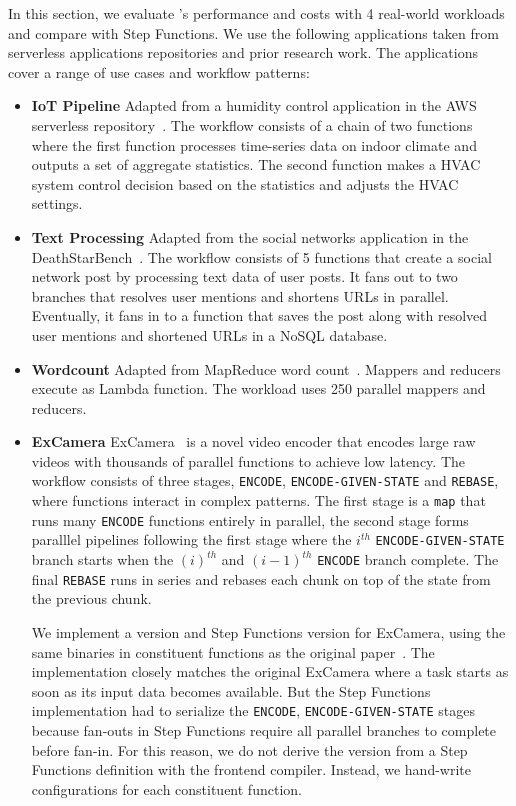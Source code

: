In this section, we evaluate \name{}'s performance and costs with 4 real-world
workloads and compare with Step Functions. We use the following applications
taken from serverless applications repositories and prior research work. The
applications cover a range of use cases and workflow patterns:

\begin{itemize}
    \item \textbf{IoT Pipeline} Adapted from a humidity control application in the
    AWS serverless repository~\cite{iot-pipeline}. The workflow consists of a
    chain of two functions where the first function processes time-series data on
    indoor climate and outputs a set of aggregate statistics. The second function
    makes a HVAC system control decision based on the statistics and adjusts the
    HVAC settings.

    \item \textbf{Text Processing} Adapted from the social networks application in
    the DeathStarBench~\cite{deathstar}. The workflow consists of 5 functions that
    create a social network post by processing text data of user posts. It fans
    out to two branches that resolves user mentions and shortens URLs in parallel.
    Eventually, it fans in to a function that saves the post along with resolved
    user mentions and shortened URLs in a NoSQL database.

    \item \textbf{Wordcount} Adapted from MapReduce word count~\cite{mapreduce}.
    Mappers and reducers execute as Lambda function. The workload uses 250
    parallel mappers and reducers.

    \item \textbf{ExCamera} ExCamera~\cite{excamera} is a novel video encoder that
    encodes large raw videos with thousands of parallel functions to achieve
    low latency. The workflow consists of three stages, \texttt{ENCODE},
    \texttt{ENCODE-GIVEN-STATE} and \texttt{REBASE}, where functions interact
    in complex patterns. The first stage is a \texttt{map} that runs many
    \texttt{ENCODE} functions entirely in parallel, the second stage forms
    paralllel pipelines following the first stage where the $i^{th}$
    \texttt{ENCODE-GIVEN-STATE} branch starts when the $(i)^{th}$ and
    $(i-1)^{th}$ \texttt{ENCODE} branch complete. The final \texttt{REBASE}
    runs in series and rebases each chunk on top of the state from the
    previous chunk.

    We implement a \name{} version and Step Functions version for ExCamera,
    using the same binaries in constituent functions as the original
    paper~\cite{excamera-binary}. The \name{} implementation closely matches
    the original ExCamera where a task starts as soon as its input data
    becomes available. But the Step Functions implementation had to serialize
    the \texttt{ENCODE}, \texttt{ENCODE-GIVEN-STATE} stages because fan-outs
    in Step Functions require all parallel branches to complete before fan-in.
    For this reason, we do not derive the \name{} version from a Step
    Functions definition with the frontend compiler. Instead, we hand-write
    \name{} configurations for each constituent function.


\end{itemize}
